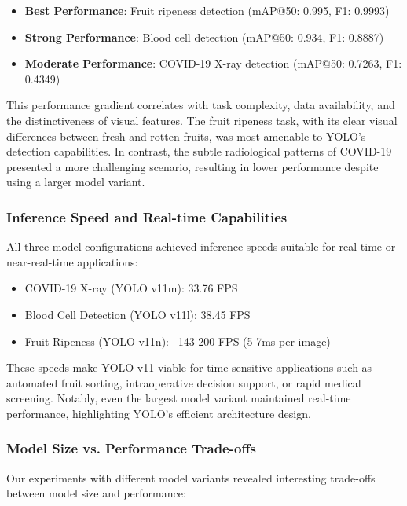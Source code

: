 \begin{multicols}{2}
\begin{itemize}
    \item \textbf{Best Performance}: Fruit ripeness detection (mAP@50: 0.995, F1: 0.9993)
    \item \textbf{Strong Performance}: Blood cell detection (mAP@50: 0.934, F1: 0.8887)
    \item \textbf{Moderate Performance}: COVID-19 X-ray detection (mAP@50: 0.7263, F1: 0.4349)
\end{itemize}

This performance gradient correlates with task complexity, data availability, and the distinctiveness of visual features. The fruit ripeness task, with its clear visual differences between fresh and rotten fruits, was most amenable to YOLO's detection capabilities. In contrast, the subtle radiological patterns of COVID-19 presented a more challenging scenario, resulting in lower performance despite using a larger model variant.

\subsubsection{Inference Speed and Real-time Capabilities}

All three model configurations achieved inference speeds suitable for real-time or near-real-time applications:

\begin{itemize}
    \item COVID-19 X-ray (YOLO v11m): 33.76 FPS
    \item Blood Cell Detection (YOLO v11l): 38.45 FPS
    \item Fruit Ripeness (YOLO v11n): ~143-200 FPS (5-7ms per image)
\end{itemize}

These speeds make YOLO v11 viable for time-sensitive applications such as automated fruit sorting, intraoperative decision support, or rapid medical screening. Notably, even the largest model variant maintained real-time performance, highlighting YOLO's efficient architecture design.

\subsubsection{Model Size vs. Performance Trade-offs}

Our experiments with different model variants revealed interesting trade-offs between model size and performance:


\end{multicols}
